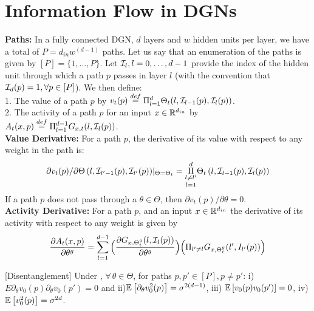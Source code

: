 \section{Information Flow in DGNs}\label{sec:expressivity}
\textbf{Paths:} In a fully connected DGN, $d$ layers and $w$ hidden units per layer, we have a total of $P=d_{in}w^{(d-1)}$ paths. Let us say that an enumeration of the paths is given by $[P]=\{1,\ldots,P\}$. Let $\mathcal{I}_{l},l=0,\ldots,d-1$ provide the index of the hidden unit through which a path $p$ passes in layer $l$ (with the convention that $\mathcal{I}_d(p)=1,\forall p\in [P]$). We then define:\\
$1.$ The value of a path $p$ by $v_t(p)\stackrel{def}=\Pi_{l=1}^d \Theta_t(l,\mathcal{I}_{l-1}(p),\mathcal{I}_l(p))$.\\
$2.$ The activity of a path $p$ for an input $x\in \mathbb{R}^{d_{in}}$ by $A_{t}(x,p)\stackrel{def}{=}\Pi_{l=1}^{d-1} G_{x,t}(l,\mathcal{I}_l(p))$.\\
\textbf{Value Derivative:} For a path $p$, the derivative of its value with respect to any weight in the path is: 
\begin{align}\label{eq:vft}{\partial v_t(p)}/{\partial \Theta\left(l,\mathcal{I}_{l'-1}(p),\mathcal{I}_{l'}(p)\right)}|_{\Theta=\Theta_t}= \underset{l=1}{\underset{l\neq l'}{\overset{d}{\Pi}}} \Theta_t\left(l,\mathcal{I}_{l-1}(p),\mathcal{I}_{l}(p)\right)
\end{align}
If a path $p$ does not pass through a $\theta\in\Theta$, then ${\partial v_t(p)}/{\partial \theta}=0$.\\
\textbf{Activity Derivative:} For a path $p$, and an input $x\in\mathbb{R}^{d_{in}}$ the derivative of its activity with respect to any weight is given by 
\begin{align}
\frac{\partial A_{t}(x,p)}{\partial \theta^g}= \sum_{l=1}^{d-1} \Big(\frac{\partial G_{x,{\Theta}^g_t}(l,\mathcal{I}_l(p))}{\partial \theta^g} \Big)\Big(\Pi_{l'\neq l} G_{x,{\Theta}^g_t}(l',I_{l'}(p))\Big)
\end{align}
\begin{lemma}\label{lm:disentangle}[Disentanglement]
Under , $\forall\,\theta\in\Theta$, for paths $p,p'\in [P], p\neq p'$:  i) $E{\partial_{\theta}v_0(p)\partial_{\theta}v_0(p')}= 0$ and ii)$\mathbb{E}\left[\partial_{\theta}v^2_0(p)\right]= \sigma^{2(d-1)}$, iii) $\mathbb{E}\left[v_0(p)v_0(p')\right]=0$, iv) $\mathbb{E}\left[v^2_0(p)\right]=\sigma^{2d}$.
\end{lemma}
